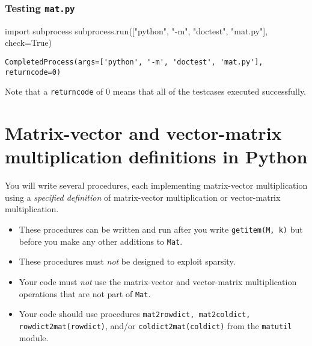 \documentclass[
  letterpaper,
  DIV=11,
  numbers=noendperiod]{scrartcl}
\newenvironment{Shaded}{\begin{snugshade}}{\end{snugshade}}
\newcommand{\ImportTok}[1]{\textcolor[rgb]{0.00,0.46,0.62}{#1}}
\newcommand{\NormalTok}[1]{\textcolor[rgb]{0.00,0.23,0.31}{#1}}
\newcommand{\OperatorTok}[1]{\textcolor[rgb]{0.37,0.37,0.37}{#1}}
\newcommand{\StringTok}[1]{\textcolor[rgb]{0.13,0.47,0.30}{#1}}
\newcommand{\VariableTok}[1]{\textcolor[rgb]{0.07,0.07,0.07}{#1}}
\begin{document}
\hypertarget{testing-mat.py}{%
\subsubsection{\texorpdfstring{Testing
\texttt{mat.py}}{Testing mat.py}}\label{testing-mat.py}}

\begin{Shaded}
\begin{Highlighting}[numbers=left,,]
\ImportTok{import}\NormalTok{ subprocess}
\NormalTok{subprocess.run([}\StringTok{"python"}\NormalTok{, }\StringTok{"{-}m"}\NormalTok{, }\StringTok{"doctest"}\NormalTok{, }\StringTok{"mat.py"}\NormalTok{], check}\OperatorTok{=}\VariableTok{True}\NormalTok{)}
\end{Highlighting}
\end{Shaded}

\begin{verbatim}
CompletedProcess(args=['python', '-m', 'doctest', 'mat.py'], returncode=0)
\end{verbatim}

Note that a \texttt{returncode} of 0 means that all of the testcases
executed successfully.

\newpage{}

\hypertarget{matrix-vector-and-vector-matrix-multiplication-definitions-in-python}{%
\section{Matrix-vector and vector-matrix multiplication definitions in
Python}\label{matrix-vector-and-vector-matrix-multiplication-definitions-in-python}}

You will write several procedures, each implementing matrix-vector
multiplication using a \emph{specified definition} of matrix-vector
multiplication or vector-matrix multiplication.

\begin{itemize}
\item These procedures can be written and run after you write \verb|getitem(M, k)| but before you make any other additions to \verb|Mat|.
\item These procedures must \textit{not} be designed to exploit sparsity.
\item Your code must \textit{not} use the matrix-vector and vector-matrix multiplication operations that are not part of \verb|Mat|.
\item Your code should use procedures \verb|mat2rowdict, mat2coldict, rowdict2mat(rowdict)|, and/or \verb|coldict2mat(coldict)| from the \verb|matutil| module.
\end{itemize}
\end{document}
